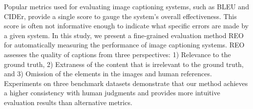 Popular metrics used for evaluating image captioning systems, such as BLEU and CIDEr, provide a single score to gauge the system's overall effectiveness. This score is often not informative enough to indicate what specific errors are made by a given system. In this study, we present a fine-grained evaluation method  REO  for automatically measuring the performance of image captioning systems.  REO  assesses the quality of captions from three perspectives: 1) Relevance to the ground truth, 2) Extraness of the content that is irrelevant to the ground truth, and 3) Omission of the elements in the images and human references. Experiments on three benchmark datasets demonstrate that our method achieves a higher consistency with human judgments and provides more intuitive evaluation results than alternative metrics.